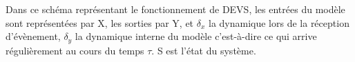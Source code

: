 \begin{minipage}{\linewidth}%
\end{minipage}

Dans ce schéma représentant le fonctionnement de DEVS, les entrées du modèle sont représentées par X, les sorties par Y, et $\delta_{x}$ la dynamique lors de la réception d'évènement, $\delta_{y}$ la dynamique interne du modèle c'est-à-dire ce qui arrive régulièrement au cours du temps $\tau$. S est l'état du système.
